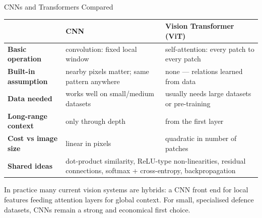 \documentclass[aspectratio=169,10pt]{beamer}
\begin{document}
\begin{frame}{CNNs and Transformers Compared}
\centering\footnotesize\renewcommand{\arraystretch}{1.35}
\begin{tabularx}{\textwidth}{>{\bfseries}p{3.0cm} X X}
\toprule
& \textbf{CNN} & \textbf{Vision Transformer (ViT)}\\\midrule
Basic operation & convolution: fixed local window & self-attention: every patch to every patch\\
Built-in assumption & nearby pixels matter; same pattern anywhere & none --- relations learned from data\\
Data needed & works well on small/medium datasets & usually needs large datasets or pre-training\\
Long-range context & only through depth & from the first layer\\
Cost vs image size & linear in pixels & quadratic in number of patches\\
Shared ideas & \multicolumn{2}{p{0.68\textwidth}}{dot-product similarity, ReLU-type non-linearities, residual connections, softmax + cross-entropy, backpropagation}\\
\bottomrule
\end{tabularx}
\vspace{4pt}
\begin{ibox}\scriptsize In practice many current vision systems are hybrids: a CNN front end for local features feeding attention layers for global context. For small, specialised defence datasets, CNNs remain a strong and economical first choice.\end{ibox}
\end{frame}
\end{document}
